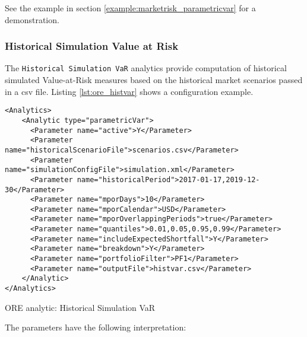 {See the example in section \ref{example:marketrisk_parametricvar} for a demonstration.

\subsubsection{Historical Simulation Value at Risk}

The {\tt Historical Simulation VaR} analytics provide computation of historical simulated Value-at-Risk measures based on the historical market scenarios passed in a csv file. Listing \ref{lst:ore_histvar} shows a configuration example.

\begin{listing}[H]
\begin{verbatim}
<Analytics>
    <Analytic type="parametricVar"> 
      <Parameter name="active">Y</Parameter> 
	  <Parameter name="historicalScenarioFile">scenarios.csv</Parameter>
      <Parameter name="simulationConfigFile">simulation.xml</Parameter>
      <Parameter name="historicalPeriod">2017-01-17,2019-12-30</Parameter>
      <Parameter name="mporDays">10</Parameter>
      <Parameter name="mporCalendar">USD</Parameter>
      <Parameter name="mporOverlappingPeriods">true</Parameter>
      <Parameter name="quantiles">0.01,0.05,0.95,0.99</Parameter>  
	  <Parameter name="includeExpectedShortfall">Y</Parameter>
      <Parameter name="breakdown">Y</Parameter>
      <Parameter name="portfolioFilter">PF1</Parameter>
      <Parameter name="outputFile">histvar.csv</Parameter> 
    </Analytic> 
</Analytics>
\end{verbatim}
\caption{ORE analytic: Historical Simulation VaR}
\label{lst:ore_histvar}
\end{listing}

The parameters have the following interpretation:

}
